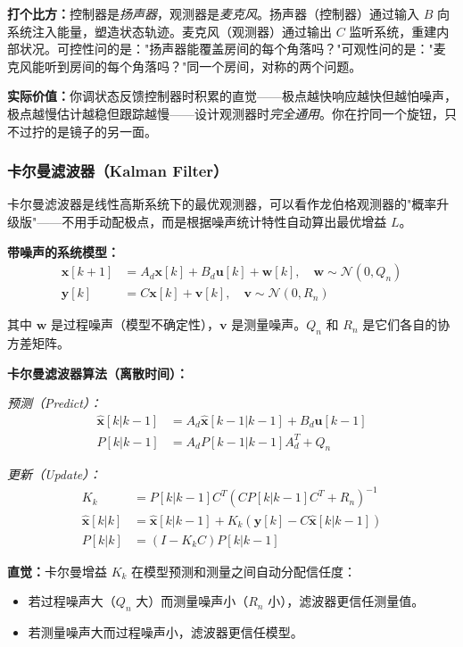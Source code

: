 \textbf{打个比方：}控制器是\textit{扬声器}，观测器是\textit{麦克风}。扬声器（控制器）通过输入 $B$ 向系统注入能量，塑造状态轨迹。麦克风（观测器）通过输出 $C$ 监听系统，重建内部状况。可控性问的是："扬声器能覆盖房间的每个角落吗？"可观性问的是："麦克风能听到房间的每个角落吗？"同一个房间，对称的两个问题。

\textbf{实际价值：}你调状态反馈控制器时积累的直觉——极点越快响应越快但越怕噪声，极点越慢估计越稳但跟踪越慢——设计观测器时\textit{完全通用}。你在拧同一个旋钮，只不过拧的是镜子的另一面。

\subsubsection{卡尔曼滤波器（Kalman Filter）}

卡尔曼滤波器是线性高斯系统下的最优观测器，可以看作龙伯格观测器的"概率升级版"——不用手动配极点，而是根据噪声统计特性自动算出最优增益 $L$。

\textbf{带噪声的系统模型：}
\begin{align}
\mathbf{x}[k+1] &= A_d \mathbf{x}[k] + B_d \mathbf{u}[k] + \mathbf{w}[k], \quad \mathbf{w} \sim \mathcal{N}(0, Q_n) \\
\mathbf{y}[k] &= C \mathbf{x}[k] + \mathbf{v}[k], \quad \mathbf{v} \sim \mathcal{N}(0, R_n)
\end{align}

其中 $\mathbf{w}$ 是过程噪声（模型不确定性），$\mathbf{v}$ 是测量噪声。$Q_n$ 和 $R_n$ 是它们各自的协方差矩阵。

\textbf{卡尔曼滤波器算法（离散时间）：}

\textit{预测（Predict）：}
\begin{align}
\hat{\mathbf{x}}[k|k-1] &= A_d \hat{\mathbf{x}}[k-1|k-1] + B_d \mathbf{u}[k-1] \\
P[k|k-1] &= A_d P[k-1|k-1] A_d^T + Q_n
\end{align}

\textit{更新（Update）：}
\begin{align}
K_k &= P[k|k-1] C^T (C P[k|k-1] C^T + R_n)^{-1} \\
\hat{\mathbf{x}}[k|k] &= \hat{\mathbf{x}}[k|k-1] + K_k (\mathbf{y}[k] - C \hat{\mathbf{x}}[k|k-1]) \\
P[k|k] &= (I - K_k C) P[k|k-1]
\end{align}

\textbf{直觉：}卡尔曼增益 $K_k$ 在模型预测和测量之间自动分配信任度：
\begin{itemize}
    \item 若过程噪声大（$Q_n$ 大）而测量噪声小（$R_n$ 小），滤波器更信任测量值。
    \item 若测量噪声大而过程噪声小，滤波器更信任模型。
\end{itemize}

